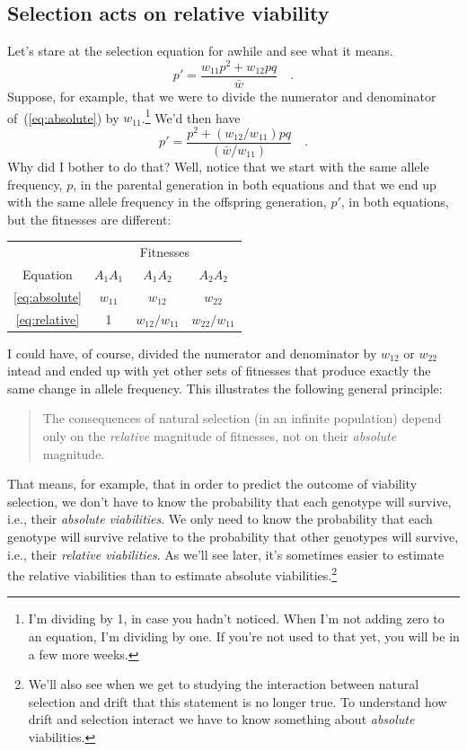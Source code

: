 \documentclass[12pt]{article}
\begin{document}
\subsection*{Selection acts on relative viability}

Let's stare at the selection equation for awhile and see what it
means.
\begin{equation}
p' = \frac{w_{11}p^2 + w_{12}pq}{\bar w} \quad . \label{eq:absolute}
\end{equation}
Suppose, for example, that we were to divide the numerator and
denominator of~(\ref{eq:absolute}) by $w_{11}$.\footnote{I'm dividing
  by 1, in case you hadn't noticed. When I'm not adding zero to an
  equation, I'm dividing by one. If you're not used to that yet, you
  will be in a few more weeks.} We'd then have
\begin{equation}
p' = \frac{p^2 + (w_{12}/w_{11})pq}{(\bar w/w_{11})} \quad . \label{eq:relative}
\end{equation}
Why did I bother to do that? Well, notice that we start with the same
allele frequency, $p$, in the parental generation in both equations
and that we end up with the same allele frequency in the offspring
generation, $p'$, in both equations, but the fitnesses are different:
\begin{center}
\begin{tabular}{c|ccc}
\hline\hline
         & \multicolumn{3}{c}{Fitnesses} \\
Equation & $A_1A_1$ & $A_1A_2$ & $A_2A_2$ \\
\hline
\ref{eq:absolute} & $w_{11}$ & $w_{12}$ & $w_{22}$ \\
\ref{eq:relative} & 1 & $w_{12}/w_{11}$ & $w_{22}/w_{11}$ \\
\hline
\end{tabular}
\end{center}
I could have, of course, divided the numerator and denominator by
$w_{12}$ or $w_{22}$ intead and ended up with yet other sets of
fitnesses that produce exactly the same change in allele
frequency. This illustrates the following general principle:
\begin{quote}
The consequences of natural selection (in an infinite population)
depend only on the {\it relative\/} magnitude of fitnesses, not on
their {\it absolute\/} magnitude.
\end{quote}
That means, for example, that in order to predict the outcome of
viability selection, we don't have to know the probability that each
genotype will survive, i.e., their {\it absolute viabilities}. We only
need to know the probability that each genotype will survive relative
to the probability that other genotypes will survive, i.e., their {\it
  relative viabilities}. As we'll see later, it's sometimes easier to
estimate the relative viabilities than to estimate absolute
viabilities.\footnote{We'll also see when we get to studying the
  interaction between natural selection and drift that this statement
  is no longer true. To understand how drift and selection interact we
  have to know something about {\it absolute\/}
  viabilities.}
\end{document}
